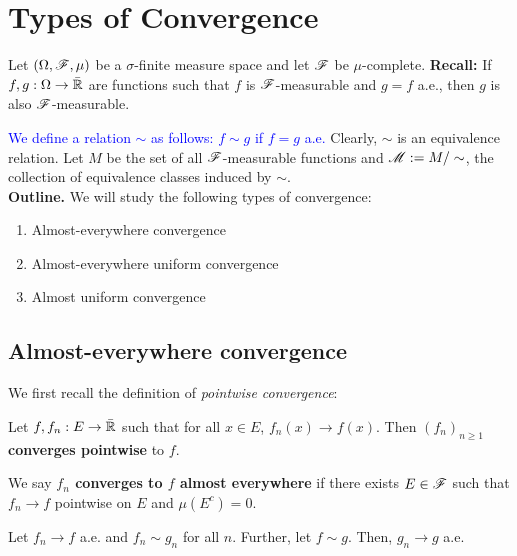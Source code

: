 \section{Types of Convergence}

Let $(\Omega, \mathscr{F}, \mu)$ be a $\sigma$-finite measure space and let $\mathscr{F}$ be $\mu$-complete. \textbf{Recall:} If $f, g: \Omega \to \bar{\mathbb{R}}$ are functions such that $f$ is $\mathscr{F}$-measurable and $g = f$ a.e., then $g$ is also $\mathscr{F}$-measurable.

\textcolor{blue}{We define a relation $\sim$ as follows: $f \sim g$ if $f = g$ a.e.} Clearly, $\sim$ is an equivalence relation. Let $M$ be the set of all $\mathscr{F}$-measurable functions and $\mathscr{M} := M / \sim$, the collection of equivalence classes induced by $\sim$. \\

\textbf{Outline.} We will study the following types of convergence:
\begin{enumerate}
    \item Almost-everywhere convergence
    \item Almost-everywhere uniform convergence
    \item Almost uniform convergence
\end{enumerate}

\subsection{Almost-everywhere convergence}

We first recall the definition of \emph{pointwise convergence}:

\begin{definition}
    Let $f, f_n: E \to \bar{\mathbb{R}}$ such that for all $x \in E$, $f_n(x) \to f(x)$. Then $(f_n)_{n \geq 1}$ \textbf{converges pointwise} to $f$.
\end{definition}

\begin{definition}
    We say \textbf{$f_n$ converges to $f$ almost everywhere} if there exists $E \in \mathscr{F}$ such that $f_n \to f$ pointwise on $E$ and $\mu(E^c) = 0$.
\end{definition}

\begin{lemma}
    Let $f_n \to f$ a.e. and $f_n \sim g_n$ for all $n$. Further, let $f \sim g$. Then, $g_n \to g$ a.e.
\end{lemma}

